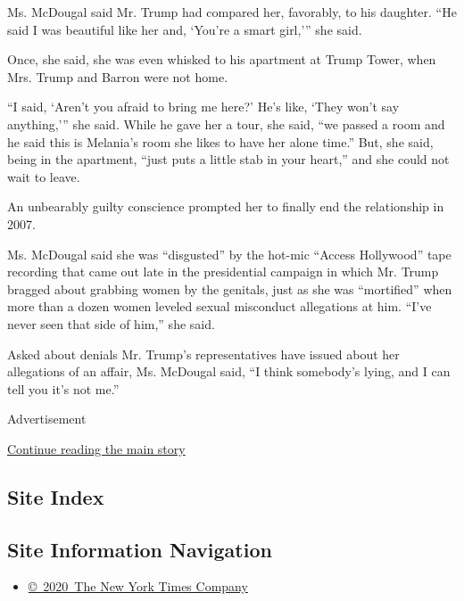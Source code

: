 Ms. McDougal said Mr. Trump had compared her, favorably, to his
daughter. ``He said I was beautiful like her and, `You're a smart
girl,''' she said.

Once, she said, she was even whisked to his apartment at Trump Tower,
when Mrs. Trump and Barron were not home.

``I said, `Aren't you afraid to bring me here?' He's like, `They won't
say anything,''' she said. While he gave her a tour, she said, ``we
passed a room and he said this is Melania's room she likes to have her
alone time.'' But, she said, being in the apartment, ``just puts a
little stab in your heart,'' and she could not wait to leave.

An unbearably guilty conscience prompted her to finally end the
relationship in 2007.

Ms. McDougal said she was ``disgusted'' by the hot-mic ``Access
Hollywood'' tape recording that came out late in the presidential
campaign in which Mr. Trump bragged about grabbing women by the
genitals, just as she was ``mortified'' when more than a dozen women
leveled sexual misconduct allegations at him. ``I've never seen that
side of him,'' she said.

Asked about denials Mr. Trump's representatives have issued about her
allegations of an affair, Ms. McDougal said, ``I think somebody's lying,
and I can tell you it's not me.''

Advertisement

\protect\hyperlink{after-bottom}{Continue reading the main story}

\hypertarget{site-index}{%
\subsection{Site Index}\label{site-index}}

\hypertarget{site-information-navigation}{%
\subsection{Site Information
Navigation}\label{site-information-navigation}}

\begin{itemize}
\tightlist
\item
  \href{https://help.nytimes3xbfgragh.onion/hc/en-us/articles/115014792127-Copyright-notice}{©~2020~The
  New York Times Company}
\end{itemize}

